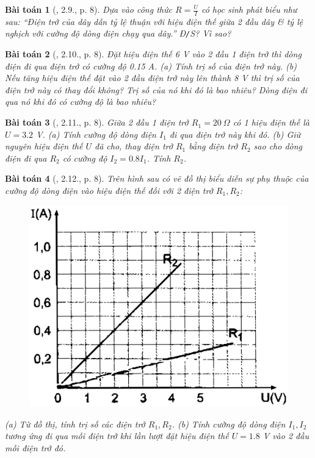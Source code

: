 \documentclass{article}
\newtheorem{baitoan}{Bài toán}
\begin{document}
\begin{baitoan}[\cite{SBT_Vat_Ly_9}, 2.9., p. 8]
	Dựa vào công thức $R = \frac{U}{I}$ có học sinh phát biểu như sau: ``Điện trở của dây dẫn tỷ lệ thuận với hiệu điện thế giữa 2 đầu dây \& tỷ lệ nghịch với cường độ dòng điện chạy qua dây.'' \emph{Đ\texttt{/}S?} Vì sao?
\end{baitoan}

\begin{baitoan}[\cite{SBT_Vat_Ly_9}, 2.10., p. 8]
	Đặt hiệu điện thế \emph{6 V} vào 2 đầu 1 điện trở thì dòng điện đi qua điện trở có cường độ \emph{0.15 A}. (a) Tính trị số của điện trở này. (b) Nếu tăng hiệu điện thế đặt vào 2 đầu điện trở này lên thành \emph{8 V} thì trị số của điện trở này có thay đổi không? Trị số của nó khi đó là bao nhiêu? Dòng điện đi qua nó khi đó có cường độ là bao nhiêu?
\end{baitoan}

\begin{baitoan}[\cite{SBT_Vat_Ly_9}, 2.11., p. 8]
	Giữa 2 đầu 1 điện trở $R_1 = 20\ \Omega$ có 1 hiệu điện thế là $U = 3.2$ \emph{V}. (a) Tính cường độ dòng điện $I_1$ đi qua điện trở này khi đó. (b) Giữ nguyên hiệu điện thế $U$ đã cho, thay điện trở $R_1$ bằng điện trở $R_2$ sao cho dòng điện đi qua $R_2$ có cường độ $I_2 = 0.8I_1$. Tính $R_2$.
\end{baitoan}

\begin{baitoan}[\cite{SBT_Vat_Ly_9}, 2.12., p. 8]
	Trên hình sau có vẽ đồ thị biểu diễn sự phụ thuộc của cường độ dòng điện vào hiệu điện thế đối với 2 điện trở $R_1,R_2$:
	\begin{figure}[H]
		\centering
		\includegraphics[scale=0.25]{SBT_2.3}
	\end{figure}
	\noindent(a) Từ đồ thị, tính trị số các điện trở $R_1,R_2$. (b) Tính cường độ dòng điện $I_1,I_2$ tương ứng đi qua mỗi điện trở khi lần lượt đặt hiệu điện thế $U = 1.8$ \emph{V} vào 2 đầu mỗi điện trở đó.
\end{baitoan}
\end{document}
